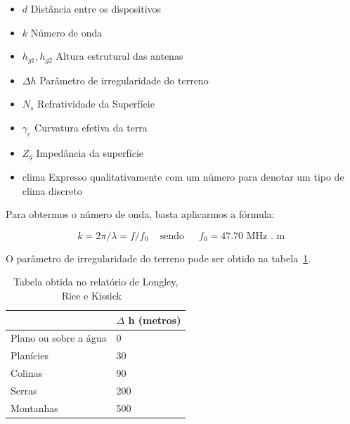 \begin{itemize}
\item \begin{math}d\end{math} Distância entre os dispositivos
\item \begin{math}k\end{math} Número de onda
\item \begin{math}h_{g1}, h_{g2}\end{math} Altura estrutural das antenas
\item \begin{math}\Delta h\end{math} Parâmetro de irregularidade do terreno
\item \begin{math}N_s\end{math} Refratividade da Superfície
\item \begin{math}\gamma _e\end{math} Curvatura efetiva da terra
\item \begin{math}Z_g\end{math} Impedância da superfície
\item clima Expresso qualitativamente com um número para denotar um tipo de clima discreto
\end{itemize}

Para obtermos o número de onda, basta aplicarmos a fórmula:

\[
k = 2\pi/\lambda = f/f_0 \,\,\,\,\, \text{ sendo} \,\,\,\,\,\,\,\,\, f_0 = 47.70 \text{ MHz . m }
\]

O parâmetro de irregularidade do terreno pode ser obtido na tabela~\ref{table:deltah}. \\

\begin{table}[h]
\centering
\caption[Valores para o parâmetro de irregularidade do terreno.]
{Tabela obtida no relatório de Longley, Rice  e Kissick ~\cite{longleyricedelta}} 
\label{table:deltah}
\begin{tabular}{ll}

\hline
                             & $\Delta$ h (metros) \\ \hline
Plano ou sobre a água        & 0                 \\
Planícies                    & 30                \\
Colinas                      & 90                \\
Serras                       & 200               \\
Montanhas                    & 500               
\end{tabular}
\end{table}


